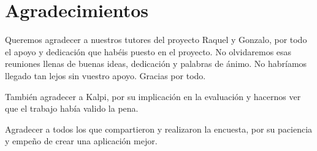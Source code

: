 
\chapter*{Agradecimientos}


Queremos agradecer a nuestros tutores del proyecto Raquel y Gonzalo, por todo el apoyo y dedicación que habéis puesto en el proyecto. No olvidaremos esas reuniones llenas de buenas ideas, dedicación y palabras de ánimo. No habríamos llegado tan lejos sin vuestro apoyo. Gracias por todo.

También agradecer a Kalpi, por su implicación en la evaluación y hacernos ver que el trabajo había valido la pena.

Agradecer a todos los que compartieron y realizaron la encuesta, por su paciencia y empeño de crear una aplicación mejor. 


